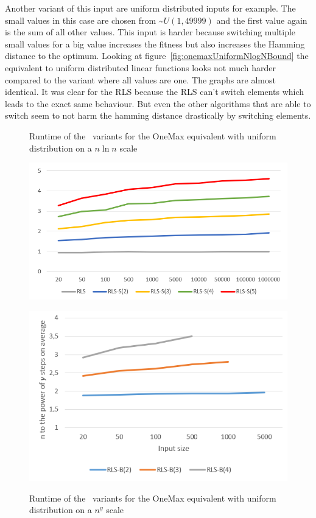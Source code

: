 Another variant of this input are uniform distributed inputs for example.
The small values in this case are chosen from \textasciitilde$U(1,49999)$ and the first value again is the sum of all other values.
This input is harder because switching multiple small values for a big value increases the fitness but also increases the Hamming distance to the optimum. Looking at figure~\ref{fig:onemaxUniformNlogNBound} the equivalent to uniform distributed linear functions looks not much harder compared to the variant where all values are one.
The graphs are almost identical.
It was clear for the RLS because the RLS can't switch elements which leads to the exact same behaviour.
But even the other algorithms that are able to switch seem to not harm the hamming distance drastically by switching elements.
\begin{figure}[h]
      \centering
      \begin{minipage}[b]{0.45\textwidth}
            \caption{Runtime of the \RLSR~variants for the OneMax equivalent with uniform distribution on a $n\ln n$ scale}
            \includegraphics[width=\textwidth]{figures/images/oneMaxUniformMultipleN_RLSRCompare.png}\label{fig:onemaxniformNlogNBoundRLSR}
      \end{minipage}
      \hspace{0.75cm}
      \begin{minipage}[b]{0.45\textwidth}
            \caption{Runtime of the \RLSN~variants for the OneMax equivalent with uniform distribution on a $n^y$ scale}
            \includegraphics[width=\textwidth]{figures/images/oneMaxUniformMultipleN_RLSBCompare.png}\label{fig:onemaxniformNlogNBoundRLSB}
      \end{minipage}
\end{figure}

